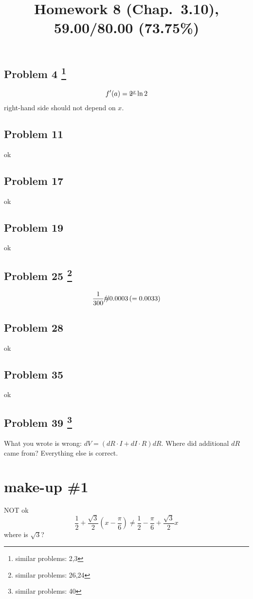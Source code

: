 \documentclass[10pt]{article} %
\title{Homework 8 (Chap.~3.10),
59.00/80.00 (73.75\%)
}
\begin{document}
\maketitle

\subsection*{Problem 4 \footnote{similar problems: 2,3}}
\begin{equation*}
  f'(a)=\mbox{\sout{$2^x$}}\ln 2
\end{equation*}
right-hand side should not depend on $x$.
\subsection*{Problem 11 }
ok
\subsection*{Problem 17 }
ok
\subsection*{Problem 19 }
ok
\subsection*{Problem 25 \footnote{similar problems: 26,24}}
\begin{equation*}
  \frac{1}{300}\mbox{\xout{$\approx$}} 0.0003\left( =0.0033 \right)
\end{equation*}
\subsection*{Problem 28 }
ok
\subsection*{Problem 35 }
ok
\subsection*{Problem 39  \footnote{similar problems: 40}}
What you wrote is wrong: \sout{$dV=\left( dR\cdot I+dI\cdot R \right)dR$}.
Where did additional $dR$ came from? Everything else is correct.
\section*{make-up \#1}
NOT ok
\begin{equation*}
	\frac{1}{2}+\frac{\sqrt{3}}{2}\left( x-\frac{\pi}{6} \right)\neq\frac{1}{2}-\frac{\pi}{6}
	+\frac{\sqrt{3}}{2}x
\end{equation*}
where is $\sqrt{3}$?
\end{document}
